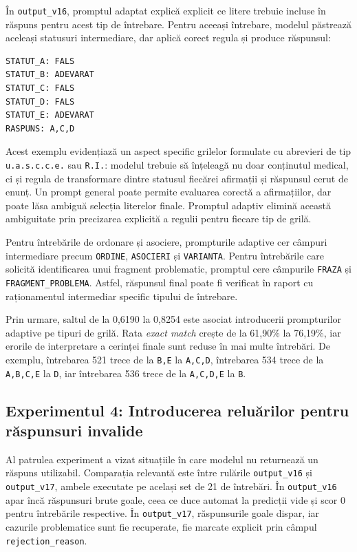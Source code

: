 \documentclass[12pt, a4paper, oneside, romanian]{teza-upb}
\begin{document}
În \texttt{output\_v16}, promptul adaptat explică explicit ce litere trebuie incluse în răspuns pentru acest tip de întrebare. Pentru aceeași întrebare, modelul păstrează aceleași statusuri intermediare, dar aplică corect regula și produce răspunsul:

\begin{lstlisting}[basicstyle=\ttfamily\footnotesize]
STATUT_A: FALS
STATUT_B: ADEVARAT
STATUT_C: FALS
STATUT_D: FALS
STATUT_E: ADEVARAT
RASPUNS: A,C,D
\end{lstlisting}

Acest exemplu evidențiază un aspect specific grilelor formulate cu abrevieri de tip \texttt{u.a.s.c.c.e.} sau \texttt{R.I.}: modelul trebuie să înțeleagă nu doar conținutul medical, ci și regula de transformare dintre statusul fiecărei afirmații și răspunsul cerut de enunț. Un prompt general poate permite evaluarea corectă a afirmațiilor, dar poate lăsa ambiguă selecția literelor finale. Promptul adaptiv elimină această ambiguitate prin precizarea explicită a regulii pentru fiecare tip de grilă.

Pentru întrebările de ordonare și asociere, prompturile adaptive cer câmpuri intermediare precum \texttt{ORDINE}, \texttt{ASOCIERI} și \texttt{VARIANTA}. Pentru întrebările care solicită identificarea unui fragment problematic, promptul cere câmpurile \texttt{FRAZA} și \texttt{FRAGMENT\_PROBLEMA}. Astfel, răspunsul final poate fi verificat în raport cu raționamentul intermediar specific tipului de întrebare.

Prin urmare, saltul de la 0,6190 la 0,8254 este asociat introducerii prompturilor adaptive pe tipuri de grilă. Rata \textit{exact match} crește de la 61,90\% la 76,19\%, iar erorile de interpretare a cerinței finale sunt reduse în mai multe întrebări. De exemplu, întrebarea 521 trece de la \texttt{B,E} la \texttt{A,C,D}, întrebarea 534 trece de la \texttt{A,B,C,E} la \texttt{D}, iar întrebarea 536 trece de la \texttt{A,C,D,E} la \texttt{B}. 



\subsection{Experimentul 4: Introducerea reluărilor pentru răspunsuri invalide}

Al patrulea experiment a vizat situațiile în care modelul nu returnează un răspuns utilizabil. Comparația relevantă este între rulările \texttt{output\_v16} și \texttt{output\_v17}, ambele executate pe același set de 21 de întrebări. În \texttt{output\_v16} apar încă răspunsuri brute goale, ceea ce duce automat la predicții vide și scor 0 pentru întrebările respective. În \texttt{output\_v17}, răspunsurile goale dispar, iar cazurile problematice sunt fie recuperate, fie marcate explicit prin câmpul \texttt{rejection\_reason}.
\end{document}
